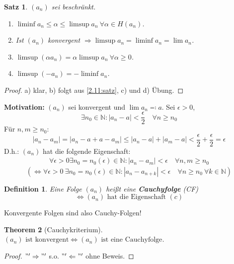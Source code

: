 \documentclass{extreport}
\newcommand{\N}{\mathbb{N}}
\theoremstyle{named}
\newtheorem{namedtheorem}{Theorem} \counterwithin{namedtheorem}{chapter}
\theoremstyle{dotless}
\newtheorem{satz}[namedtheorem]{Satz}
\newtheorem*{definition}{Definition}
\begin{document}
\begin{satz} \label{2.14:satz}
	$(a_{n})$ sei beschränkt.
	\begin{enumerate}
		\item $\liminf a_{n} \leq \alpha \leq \limsup a_{n} ~\forall \alpha \in H(a_{n})$.
		\item Ist $(a_{n})$ konvergent $\Rightarrow \limsup a_{n} = \liminf a_{n} = \lim a_{n}$.
		\item $\limsup(\alpha a_{n}) = \alpha \limsup a_{n} ~\forall \alpha \geq 0$.
		\item $\limsup(-a_{n}) = - \liminf a_{n}$.
	\end{enumerate}
\end{satz}

\begin{proof}
	a) klar, b) folgt aus \ref{2.11:satz}, c) und d) Übung.
\end{proof}


\textbf{Motivation:} $(a_{n})$ sei konvergent und $\lim a_{n} \eqqcolon a$. Sei $\epsilon > 0$,
	$$ \exists n_{0} \in \N: |a_{n} - a| < \frac{\epsilon}{2} \quad \forall n \geq n_{0} $$
Für $n, m \geq n_{0}$:
	$$ |a_{n} - a_{m}| = |a_{n} - a + a - a_{m} | \leq |a_{n} - a| + |a_{m} - a| < \frac{\epsilon}{2} + \frac{\epsilon}{2} = \epsilon $$
D.h.: $(a_{n})$ hat die folgende Eigenschaft:
	\begin{align*}
		\forall \epsilon > 0 \exists n_{0} = n_{0}(\epsilon) \in \N: |a_{n} - a_{m}| < \epsilon \quad \forall n,m \geq n_{0} \tag{c}
	\end{align*}
$$ (\iff \forall \epsilon > 0 ~\exists n_{0} = n_{0}(\epsilon) \in \N: |a_{n} - a_{n+k}| < \epsilon \quad \forall n \geq n_{0} ~\forall k \in \N) $$

\begin{definition} 
	Eine Folge $(a_{n})$ hei{\ss}t eine \textbf{Cauchyfolge} (CF)
	$$ \iff (a_{n}) \text{ hat die Eigenschaft } (c) $$	
\end{definition}


Konvergente Folgen sind also Cauchy-Folgen!

\begin{namedtheorem}[Cauchykriterium] $(a_{n}) \text{ ist konvergent} \iff (a_{n}) \text{ ist eine Cauchyfolge}$. \label{2.15:prop} 
\end{namedtheorem}

\begin{proof}
	$"'\Rightarrow"'$ s.o. $"'\Leftarrow"'$ ohne Beweis.
\end{proof}
\end{document}
